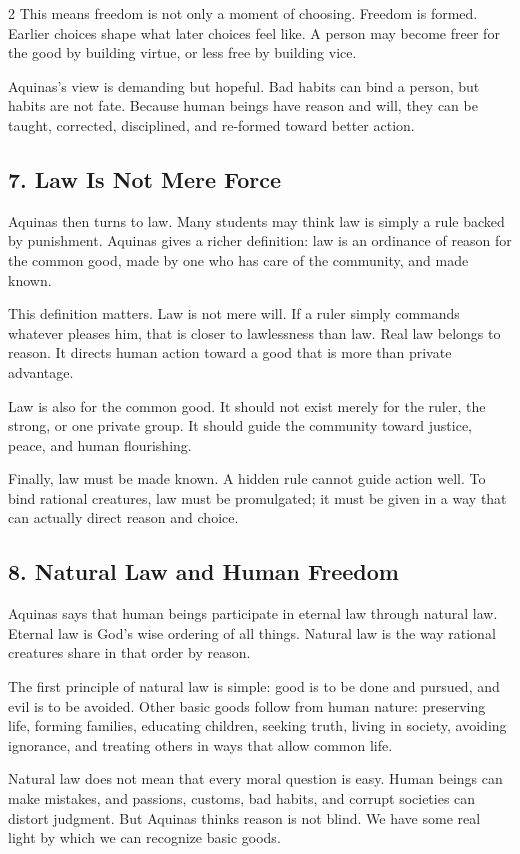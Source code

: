 \documentclass[12pt]{article}
\begin{document}
\begin{multicols}{2}
This means freedom is not only a moment of choosing. Freedom is formed. Earlier choices shape what later choices feel like. A person may become freer for the good by building virtue, or less free by building vice.

Aquinas's view is demanding but hopeful. Bad habits can bind a person, but habits are not fate. Because human beings have reason and will, they can be taught, corrected, disciplined, and re-formed toward better action.

\subsection*{7. Law Is Not Mere Force}
Aquinas then turns to law. Many students may think law is simply a rule backed by punishment. Aquinas gives a richer definition: law is an ordinance of reason for the common good, made by one who has care of the community, and made known.

This definition matters. Law is not mere will. If a ruler simply commands whatever pleases him, that is closer to lawlessness than law. Real law belongs to reason. It directs human action toward a good that is more than private advantage.

Law is also for the common good. It should not exist merely for the ruler, the strong, or one private group. It should guide the community toward justice, peace, and human flourishing.

Finally, law must be made known. A hidden rule cannot guide action well. To bind rational creatures, law must be promulgated; it must be given in a way that can actually direct reason and choice.

\subsection*{8. Natural Law and Human Freedom}
Aquinas says that human beings participate in eternal law through natural law. Eternal law is God's wise ordering of all things. Natural law is the way rational creatures share in that order by reason.

The first principle of natural law is simple: good is to be done and pursued, and evil is to be avoided. Other basic goods follow from human nature: preserving life, forming families, educating children, seeking truth, living in society, avoiding ignorance, and treating others in ways that allow common life.

Natural law does not mean that every moral question is easy. Human beings can make mistakes, and passions, customs, bad habits, and corrupt societies can distort judgment. But Aquinas thinks reason is not blind. We have some real light by which we can recognize basic goods.


\end{multicols}
\end{document}
